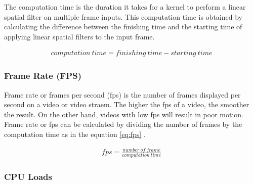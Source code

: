 The computation time is the duration it takes for a kernel to perform a linear spatial filter on multiple frame inputs. This computation time is obtained by calculating the difference between the finishing time and the starting time of applying linear spatial filters to the input frame.

\begin{equation}
    \label{eq:time}
    \begin{split}
computation\ time = finishing\ time - starting\ time
    \end{split}
\end{equation}

\subsubsection{Frame Rate (FPS)}

Frame rate or frames per second (fps) is the number of frames displayed per second on a video or video straem. The higher the fps of a video, the smoother the result. On the other hand, videos with low fps will result in poor motion. Frame rate or fps can be calculated by dividing the number of frames by the computation time as in the equation \ref{eq:fps} \cite{pdf:pavan}.

\begin{equation}
    \label{eq:fps}
    \begin{split}
fps = \frac{number\ of\ frame}{computation\ time}
    \end{split}
\end{equation}

\subsubsection{CPU Loads}

